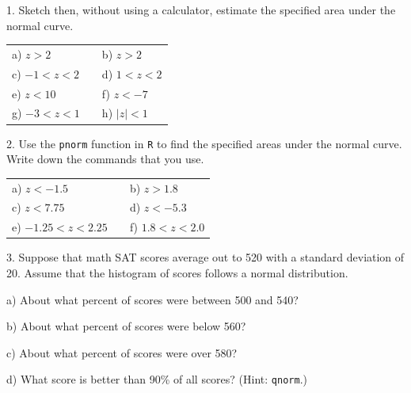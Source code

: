 \documentclass[10pt]{article}
\begin{document}
1. Sketch then, without using a calculator, estimate the specified area under the normal curve.

\begin{center}
\begin{tabular}{lcl}
a) $z>2$ & \hspace{3in} & b) $z>2$\\[.6in]
c) $-1<z<2$ &           & d) $1<z<2$\\[.6in]
e) $z<10$   &           & f) $z<-7$\hphantom{\hspace{1in}}\\[.6in]
g) $-3<z<1$ &           & h) $|z|<1$\\[.6in]
\end{tabular}
\end{center}

2. Use the \texttt{pnorm} function in \texttt{R} to find the specified areas under the normal curve.
Write down the commands that you use.
\begin{center}
\begin{tabular}{lcl}
a) $z<-1.5$ & \hspace{3in} & b) $z>1.8$\\[.6in]
c) $z<7.75$   &           & d) $z<-5.3$\hphantom{\hspace{1in}}\\[.6in]
e) $-1.25<z<2.25$ &           & f) $1.8<z<2.0$\\
\end{tabular}
\end{center}
\vfill
\eject

3. Suppose that math SAT scores average out to 520 with a standard deviation of 20.
Assume that the histogram of scores follows a normal distribution.

\hspace{10pt} a) About what percent of scores were between 500 and 540?
\vspace{.8in}

\hspace{10pt} b) About what percent of scores were below 560?
\vspace{.8in}

\hspace{10pt} c) About what percent of scores were over 580?
\vspace{.8in}

\hspace{10pt} d) What score is better than 90\% of all scores? (Hint:  \texttt{qnorm}.)
\vspace{1in}
\end{document}
